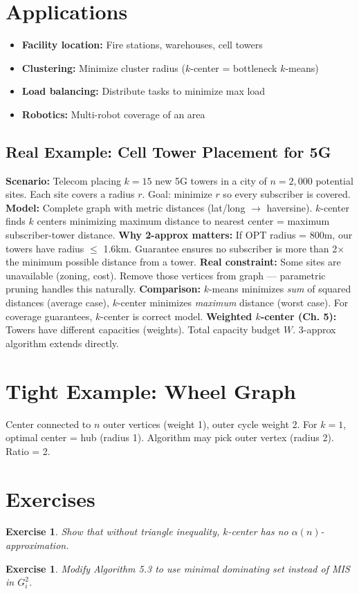 \documentclass[11pt,oneside]{book}
\newtheorem{exercise}[theorem]{Exercise}
\begin{document}
\section{Applications}
\begin{itemize}
    \item \textbf{Facility location:} Fire stations, warehouses, cell towers
    \item \textbf{Clustering:} Minimize cluster radius ($k$-center = bottleneck $k$-means)
    \item \textbf{Load balancing:} Distribute tasks to minimize max load
    \item \textbf{Robotics:} Multi-robot coverage of an area
\end{itemize}

\subsection*{Real Example: Cell Tower Placement for 5G}
\textbf{Scenario:} Telecom placing $k=15$ new 5G towers in a city of $n=2,000$ potential sites. Each site covers a radius $r$. Goal: minimize $r$ so every subscriber is covered.
\textbf{Model:} Complete graph with metric distances (lat/long $\to$ haversine). $k$-center finds $k$ centers minimizing maximum distance to nearest center = maximum subscriber-tower distance.
\textbf{Why 2-approx matters:} If OPT radius = 800m, our towers have radius $\leq$ 1.6km. Guarantee ensures no subscriber is more than 2$\times$ the minimum possible distance from a tower.
\textbf{Real constraint:} Some sites are unavailable (zoning, cost). Remove those vertices from graph — parametric pruning handles this naturally.
\textbf{Comparison:} $k$-means minimizes \emph{sum} of squared distances (average case), $k$-center minimizes \emph{maximum} distance (worst case). For coverage guarantees, $k$-center is correct model.
\textbf{Weighted $k$-center (Ch. 5):} Towers have different capacities (weights). Total capacity budget $W$. 3-approx algorithm extends directly.

\section{Tight Example: Wheel Graph}
Center connected to $n$ outer vertices (weight 1), outer cycle weight 2. For $k=1$, optimal center = hub (radius 1). Algorithm may pick outer vertex (radius 2). Ratio = 2.

\section{Exercises}
\begin{exercise}
Show that without triangle inequality, $k$-center has no $\alpha(n)$-approximation.
\end{exercise}
\begin{exercise}
Modify Algorithm 5.3 to use minimal dominating set instead of MIS in $G_i^2$.
\end{exercise}
\end{document}
